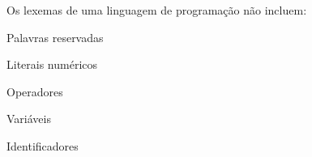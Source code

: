 \question[10]

Os lexemas de uma linguagem de programação não incluem:

\begin{choices}
\item Palavras reservadas
\item Literais numéricos
\item Operadores
\item Variáveis %
\item Identificadores
\end{choices}
\answerline

